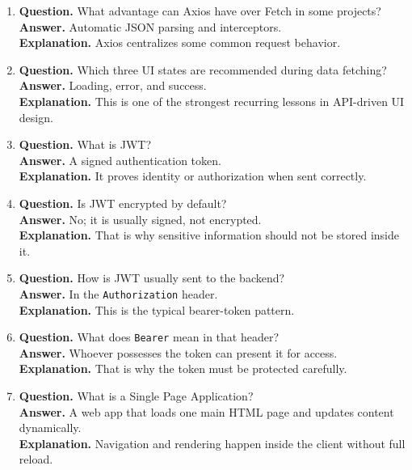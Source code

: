 \documentclass[11pt,a4paper]{article}
\begin{document}
\begin{enumerate}
  \item \textbf{Question.} What advantage can Axios have over Fetch in some projects?\\
  \textbf{Answer.} Automatic JSON parsing and interceptors.\\
  \textbf{Explanation.} Axios centralizes some common request behavior.

  \item \textbf{Question.} Which three UI states are recommended during data fetching?\\
  \textbf{Answer.} Loading, error, and success.\\
  \textbf{Explanation.} This is one of the strongest recurring lessons in API-driven UI design.

  \item \textbf{Question.} What is JWT?\\
  \textbf{Answer.} A signed authentication token.\\
  \textbf{Explanation.} It proves identity or authorization when sent correctly.

  \item \textbf{Question.} Is JWT encrypted by default?\\
  \textbf{Answer.} No; it is usually signed, not encrypted.\\
  \textbf{Explanation.} That is why sensitive information should not be stored inside it.

  \item \textbf{Question.} How is JWT usually sent to the backend?\\
  \textbf{Answer.} In the \texttt{Authorization} header.\\
  \textbf{Explanation.} This is the typical bearer-token pattern.

  \item \textbf{Question.} What does \texttt{Bearer} mean in that header?\\
  \textbf{Answer.} Whoever possesses the token can present it for access.\\
  \textbf{Explanation.} That is why the token must be protected carefully.

  \item \textbf{Question.} What is a Single Page Application?\\
  \textbf{Answer.} A web app that loads one main HTML page and updates content dynamically.\\
  \textbf{Explanation.} Navigation and rendering happen inside the client without full reload.


\end{enumerate}
\end{document}
